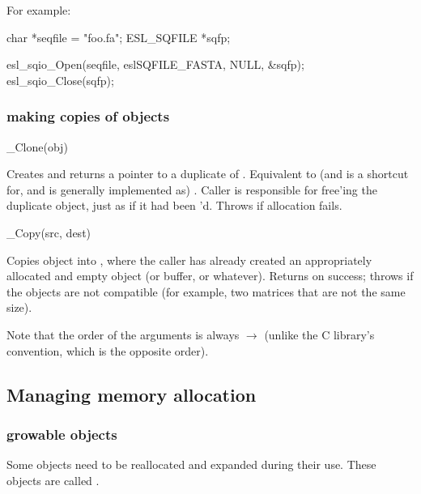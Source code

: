For example:
\begin{cchunk}
    char        *seqfile = "foo.fa";
    ESL_SQFILE  *sqfp;

    esl_sqio_Open(seqfile, eslSQFILE_FASTA, NULL, &sqfp);
    esl_sqio_Close(sqfp);
\end{cchunk}


  \subsubsection{making copies of objects}

\begin{sreapi}

\hypertarget{ifc:Clone}
{\item[\_Clone(obj)]}

Creates and returns a pointer to a duplicate of .
Equivalent to (and is a shortcut for, and is generally implemented as)
. Caller is responsible
for free'ing the duplicate object, just as if it had been
'd. Throws  if allocation fails.

\hypertarget{ifc:Copy}
{\item[\_Copy(src, dest)]}

Copies  object into , where the caller has
already created an appropriately allocated and empty 
object (or buffer, or whatever). Returns  on success;
throws  if the objects are not compatible (for
example, two matrices that are not the same size).

Note that the order of the arguments is always 
$\rightarrow$  (unlike the C library's 
convention, which is the opposite order).

\end{sreapi}

  \subsection{Managing memory allocation}

  \subsubsection{growable objects}

Some objects need to be reallocated and expanded during their use.
These objects are called .

